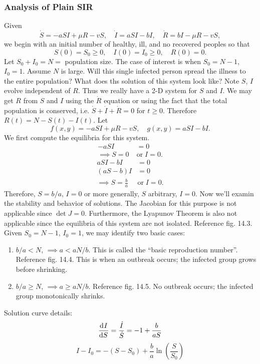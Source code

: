 \documentclass[12pt]{article}
\begin{document}
\subsubsection{Analysis of Plain SIR}
Given
\begin{equation*}
  \dot{S}=-aSI+\mu R-vS,\quad\dot{I}=aSI-bI,\quad\dot{R}=bI-\mu R-vS,
\end{equation*}
we begin with an initial number of healthy, ill, and no recovered peoples so that
\begin{equation*}
  S(0)=S_0\ge0,\quad I(0)=I_0\ge0,\quad R(0)=0.
\end{equation*}
Let $S_0+I_0=N=$ population size. The case of interest is when $S_0=N-1$,
$I_0=1$. Assume $N$ is large. Will this single infected person spread the
illness to the entire population? What does ths solution of this system look
like? Note $S$, $I$ evolve independent of $R$. Thus we really have a 2-D system
for $S$ and $I$. We may get $R$ from $S$ and $I$ using the $\dot{R}$ equation or
using the fact that the total population is conserved, i.e.
$\dot{S}+\dot{I}+\dot{R}=0$ for $t\ge0$. Therefore $R(t)=N-S(t)-I(t)$. Let
\begin{equation*}
  f(x,y)=-aSI+\mu R-vS,\quad g(x,y)=aSI-bI.
\end{equation*}
We first compute the equilibria for this system.
\begin{equation*}
  \begin{aligned}
    -aSI&=0\\\implies S=0\;&\text{or}\;I=0.
  \end{aligned}
  \end{equation*}
\begin{equation*}
  \begin{aligned}
    aSI-bI&=0 \\
    (aS-b)I&=0 \\
    \implies S=\frac{b}{a}\;&\text{or}\;I=0.
  \end{aligned}
\end{equation*}
Therefore, $S=b/a$, $I=0$ or more generally, $S$ arbitrary, $I=0$. Now we'll
examin the stability and behavior of solutions. The Jacobian for this purpose is
not applicable since $\det J=0$. Furthermore, the Lyapunov Theorem is also not
applicable since the equilibria of this system are not isolated. Reference fig.
14.3. Given $S_0=N-1$, $I_0=1$, we may identify two basic cases:
\begin{enumerate}
\item $b/a<N$, $\implies a<aN/b$. This is called the ``basic reproduction
  number''. Reference fig. 14.4. This is when an outbreak occurs; the infected
  group grows before shrinking.
\item $b/a\ge N$, $\implies a\ge aN/b$. Reference fig. 14.5. No outbreak occurs;
  the infected group monotonically shrinks.
\end{enumerate}
Solution curve details:
\begin{equation*}
  \frac{\mathrm{d}^{} {I}}{\mathrm{d}{S}^{}} = \frac{\dot{I}}{\dot{S}}=-1+\frac{b}{aS}
\end{equation*}
\begin{equation*}
  I-I_0=-(S-S_0)+\frac{b}{a}\ln \left( \frac{S}{S_0} \right)
\end{equation*}
\end{document}
